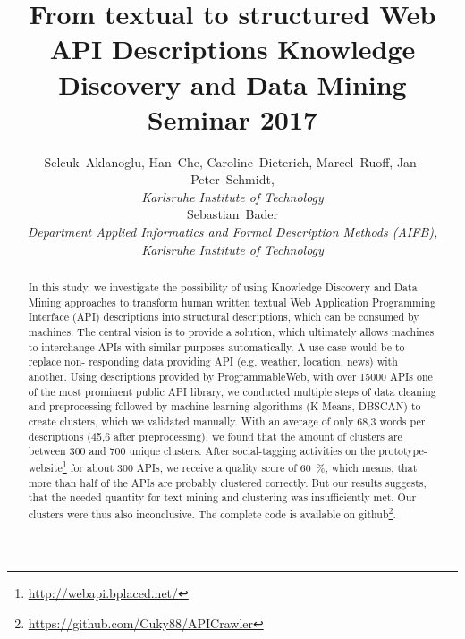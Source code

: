 \documentclass[a4paper]{IEEEtran}
\begin{document}
\title{ From textual to structured Web API Descriptions {\large Knowledge Discovery and Data Mining Seminar 2017}}

\author{Selcuk~Aklanoglu,
        Han~Che,
        Caroline~Dieterich,
        Marcel~Ruoff,
        Jan-Peter~Schmidt,  \\
\textit{Karlsruhe Institute of Technology}  \\
Sebastian~Bader \\
\textit{Department Applied Informatics and  Formal Description Methods (AIFB),  \\
Karlsruhe Institute of Technology}

}



\maketitle

\begin{abstract}
In this study, we investigate the possibility of using Knowledge Discovery and Data Mining approaches to transform human written textual Web Application Programming Interface
(API) descriptions into structural descriptions, which
can be consumed by machines. The central vision
is to provide a solution, which ultimately allows
machines to interchange APIs with similar purposes
automatically. A use case would be to replace non-
responding data providing API (e.g. weather,
location, news) with another. Using descriptions
provided by ProgrammableWeb, with over 15000
APIs one of the most prominent public API library,
we conducted multiple steps of data cleaning and
preprocessing followed by machine learning
algorithms (K-Means, DBSCAN) to create clusters,
which we validated manually. With an average of only
68,3 words per descriptions (45,6 after
preprocessing), we found that the amount of clusters are between 300 and 700 unique clusters. After social-tagging activities on the prototype-website\footnote{\url{http://webapi.bplaced.net/}} for about 300 APIs, we receive a quality score of 60~\%, which means, that more than half of the APIs are probably clustered correctly. But our results suggests, that the
needed quantity for text mining and clustering was insufficiently met. Our clusters were thus also inconclusive. 
The complete code is available on github\footnote{\url{https://github.com/Cuky88/APICrawler}}.
\end{abstract}


\IEEEpeerreviewmaketitle
\end{document}
